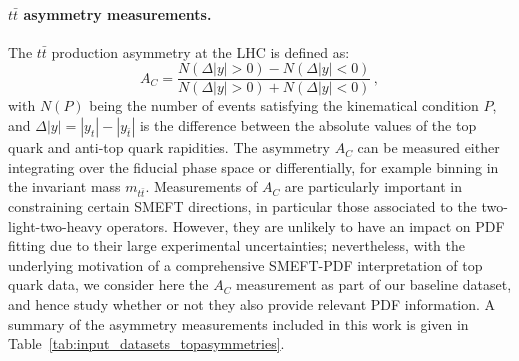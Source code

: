 \documentclass[withindex,glossary]{cam-thesis}
\newcommand{\JM}[1]{{\bf\color{cyan}JM: #1}}
\begin{document}




 \paragraph{$t\bar{t}$ asymmetry measurements.} The $t\bar{t}$ production asymmetry
 at the LHC is defined as:
 \begin{equation}
   \label{eq:ac}
A_C = \frac{N(\Delta |y| > 0) - N(\Delta |y| < 0)}{N(\Delta |y| > 0) + N(\Delta |y| < 0)} \, ,
\end{equation}
with $N(P)$ being the number of events satisfying the kinematical condition $P$, and $\Delta |y| = |y_t| - |y_{\bar{t}}|$ is the difference between the absolute values of the top quark and anti-top quark rapidities.
%
The asymmetry $A_C$ can be measured either integrating over the fiducial phase space
or differentially, for example binning in the invariant mass $m_{t\bar{t}}$.
%
Measurements of $A_C$ are particularly important in constraining certain SMEFT directions,
in particular those associated to the two-light-two-heavy operators.
%
However, they are unlikely to have an impact on PDF fitting due to their large
experimental uncertainties; nevertheless, with the underlying 
motivation of a comprehensive SMEFT-PDF interpretation
of top quark data, we consider here the $A_C$ measurement as part of our baseline dataset,
and hence study whether or not they also provide relevant PDF information. 
% 
A summary of the asymmetry measurements included in this work is given in Table~\ref{tab:input_datasets_topasymmetries}.
\end{document}

